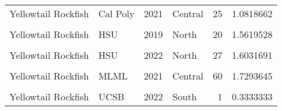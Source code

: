 \documentclass[
]{article}
\begin{document}
\begin{longtable}[t]{llrlrr}
Yellowtail Rockfish & Cal Poly & 2021 & Central & 25 & 1.0818662\\
\cellcolor{gray!6}{Yellowtail Rockfish} & \cellcolor{gray!6}{Cal Poly} & \cellcolor{gray!6}{2022} & \cellcolor{gray!6}{Central} & \cellcolor{gray!6}{15} & \cellcolor{gray!6}{0.8112033}\\
\addlinespace
Yellowtail Rockfish & HSU & 2019 & North & 20 & 1.5619528\\
\cellcolor{gray!6}{Yellowtail Rockfish} & \cellcolor{gray!6}{HSU} & \cellcolor{gray!6}{2021} & \cellcolor{gray!6}{North} & \cellcolor{gray!6}{99} & \cellcolor{gray!6}{3.3817745}\\
Yellowtail Rockfish & HSU & 2022 & North & 27 & 1.6031691\\
\cellcolor{gray!6}{Yellowtail Rockfish} & \cellcolor{gray!6}{MLML} & \cellcolor{gray!6}{2019} & \cellcolor{gray!6}{Central} & \cellcolor{gray!6}{21} & \cellcolor{gray!6}{1.1338576}\\
Yellowtail Rockfish & MLML & 2021 & Central & 60 & 1.7293645\\
\addlinespace
\cellcolor{gray!6}{Yellowtail Rockfish} & \cellcolor{gray!6}{MLML} & \cellcolor{gray!6}{2022} & \cellcolor{gray!6}{Central} & \cellcolor{gray!6}{46} & \cellcolor{gray!6}{1.0150536}\\
Yellowtail Rockfish & UCSB & 2022 & South & 1 & 0.3333333\\*
\end{longtable}
\end{document}

